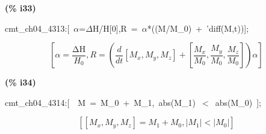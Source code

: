 \documentclass[fleqn]{article}
\begin{document}
\noindent
\begin{minipage}[t]{4.000000em}\color{red}\bfseries
(\% i33)	
\end{minipage}
\begin{minipage}[t]{\textwidth}\color{blue}
cmt\_ch04\_4313:[\ \ensuremath{\alpha}=\ensuremath{\Delta}H/H[0],R\ =\ \ensuremath{\alpha}*((M/M\_0)\ +\ 'diff(M,t))];
\end{minipage}
\[\displaystyle \tag{\% o33} 
\left[ \alpha =\frac{\ensuremath{\mathrm{\Delta H}}}{{H_0}}\operatorname{,}R=\left( \frac{d}{d t} \left[ {M_x}\operatorname{,}{M_y}\operatorname{,}{M_z}\right] +\left[ \frac{{M_x}}{{M_0}}\operatorname{,}\frac{{M_y}}{{M_0}}\operatorname{,}\frac{{M_z}}{{M_0}}\right] \right)  \alpha \right] \mbox{}
\]


\noindent
\begin{minipage}[t]{4.000000em}\color{red}\bfseries
(\% i34)	
\end{minipage}
\begin{minipage}[t]{\textwidth}\color{blue}
cmt\_ch04\_4314:[\ \ M\ =\ M\_0\ +\ M\_1,\ abs(M\_1)\ \ensuremath{<}\ abs(M\_0)\ ];
\end{minipage}
\[\displaystyle \tag{\% o34} 
\left[ \left[ {M_x}\operatorname{,}{M_y}\operatorname{,}{M_z}\right] ={M_1}+{M_0}\operatorname{,}\left| {M_1}\right| \operatorname{<  }\left| {M_0}\right| \right] \mbox{}
\]
\end{document}
